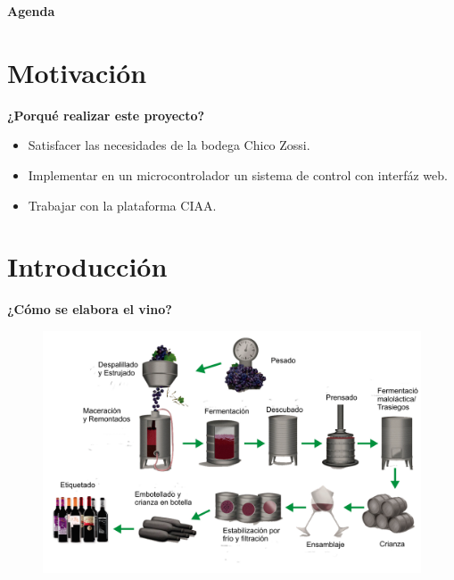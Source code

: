 \documentclass[11pt]{beamer}
\begin{document}
\begin{frame}{\textbf{\LARGE{Agenda}}}
  \fontsize{18pt}{18}\selectfont
  \tableofcontents
\end{frame}

\section{Motivación}
\begin{frame}{\textbf{\LARGE{¿Porqué realizar este proyecto?}}}
  \fontsize{18pt}{18}\selectfont
  \vspace{-30px}
  \begin{itemize}
    \item Satisfacer las necesidades de la bodega Chico Zossi.
      \vspace{5px}
    \item Implementar en un microcontrolador un sistema de control con interfáz web.
      \vspace{5px}
    \item Trabajar con la plataforma CIAA.
  \end{itemize}
\end{frame}

\section{Introducción}

\begin{frame}{\textbf{\LARGE{¿Cómo se elabora el vino?}}}
  \fontsize{18pt}{18}\selectfont
  \hspace{-40px}
  \vspace{-30px}
  \begin{figure}[H]
    \includegraphics[width=1\textwidth]{./imagenes/elaboracion-del-vino-tinto.png}
  \end{figure}	  	  	
\end{frame}
\end{document}
